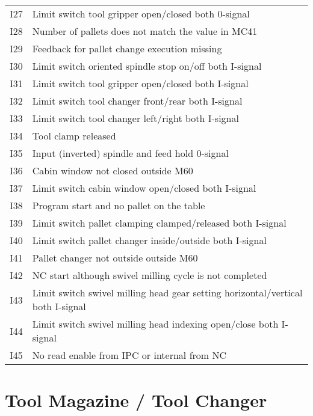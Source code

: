 \documentclass[openany,11pt]{book}
\begin{document}
\begin{table}[!h]
    \begin{tabular}{ll}
    I27 & Limit switch tool gripper open/closed both 0-signal \\ 
    I28 & Number of pallets does not match the value in MC41 \\ 
    I29 & Feedback for pallet change execution missing \\ 
    I30 & Limit switch oriented spindle stop on/off both I-signal \\ 
    I31 & Limit switch tool gripper open/closed both I-signal \\ 
    I32 & Limit switch tool changer front/rear both I-signal \\ 
    I33 & Limit switch tool changer left/right both I-signal \\ 
    I34 & Tool clamp released \\ 
    I35 & Input (inverted) spindle and feed hold 0-signal \\ 
    I36 & Cabin window not closed outside M60 \\ 
    I37 & Limit switch cabin window open/closed both I-signal \\ 
    I38 & Program start and no pallet on the table \\ 
    I39 & Limit switch pallet clamping clamped/released both I-signal \\ 
    I40 & Limit switch pallet changer inside/outside both I-signal \\ 
    I41 & Pallet changer not outside outside M60 \\ 
    I42 & NC start although swivel milling cycle is not completed \\ 
    I43 & Limit switch swivel milling head gear setting horizontal/vertical both I-signal \\ 
    I44 & Limit switch swivel milling head indexing open/close both I-signal \\
    I45 & No read enable from IPC or internal from NC \\
    \end{tabular}
\end{table}

\newpage

\section*{Tool Magazine / Tool Changer}
\end{document}
